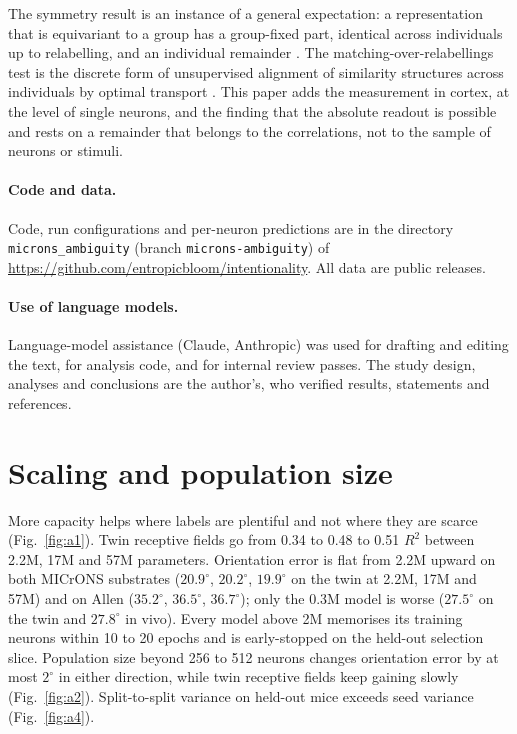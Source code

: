 \documentclass[11pt]{article}
\newcommand{\Rsq}{R^{2}}
\begin{document}
The symmetry result is an instance of a general expectation: a representation that is equivariant to a group has a group-fixed part, identical across individuals up to relabelling, and an individual remainder \citep{oizumi2026}. The matching-over-relabellings test is the discrete form of unsupervised alignment of similarity structures across individuals by optimal transport \citep{kawakita2025}. This paper adds the measurement in cortex, at the level of single neurons, and the finding that the absolute readout is possible and rests on a remainder that belongs to the correlations, not to the sample of neurons or stimuli.

\paragraph{Code and data.} Code, run configurations and per-neuron predictions are in the directory \texttt{microns\_ambiguity} (branch \texttt{microns-ambiguity}) of \url{https://github.com/entropicbloom/intentionality}. All data are public releases.

\paragraph{Use of language models.} Language-model assistance (Claude, Anthropic) was used for drafting and editing the text, for analysis code, and for internal review passes. The study design, analyses and conclusions are the author's, who verified results, statements and references.




\clearpage
\appendix
\renewcommand{\thefigure}{A\arabic{figure}}
\setcounter{figure}{0}
\section{Scaling and population size}\label{app:scaling}
More capacity helps where labels are plentiful and not where they are scarce (Fig.~\ref{fig:a1}). Twin receptive fields go from 0.34 to 0.48 to 0.51 $\Rsq$ between 2.2M, 17M and 57M parameters. Orientation error is flat from 2.2M upward on both MICrONS substrates ($20.9^\circ$, $20.2^\circ$, $19.9^\circ$ on the twin at 2.2M, 17M and 57M) and on Allen ($35.2^\circ$, $36.5^\circ$, $36.7^\circ$); only the 0.3M model is worse ($27.5^\circ$ on the twin and $27.8^\circ$ in vivo). Every model above 2M memorises its training neurons within 10 to 20 epochs and is early-stopped on the held-out selection slice. Population size beyond 256 to 512 neurons changes orientation error by at most $2^\circ$ in either direction, while twin receptive fields keep gaining slowly (Fig.~\ref{fig:a2}). Split-to-split variance on held-out mice exceeds seed variance (Fig.~\ref{fig:a4}).
\end{document}
